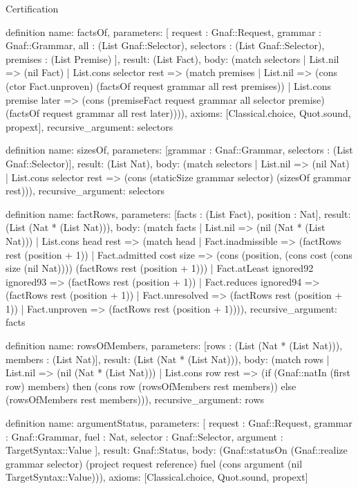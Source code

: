 \begin{lexlean}{Certification}
\begin{semanticmodule}
definition{
  name: factsOf,
  parameters: [
    request : Gnaf::Request,
    grammar : Gnaf::Grammar,
    all : (List Gnaf::Selector),
    selectors : (List Gnaf::Selector),
    premises : (List Premise)
  ],
  result: (List Fact),
  body: (match selectors
    | List.nil => (nil Fact)
    | List.cons selector rest => (match premises
      | List.nil => (cons (ctor Fact.unproven) (factsOf request grammar all rest premises))
      | List.cons premise later => (cons (premiseFact request grammar all selector premise) (factsOf request grammar all rest later)))),
  axioms: [Classical.choice, Quot.sound, propext],
  recursive_argument: selectors
}

definition{
  name: sizesOf,
  parameters: [grammar : Gnaf::Grammar, selectors : (List Gnaf::Selector)],
  result: (List Nat),
  body: (match selectors
    | List.nil => (nil Nat)
    | List.cons selector rest => (cons (staticSize grammar selector) (sizesOf grammar rest))),
  recursive_argument: selectors
}

definition{
  name: factRows,
  parameters: [facts : (List Fact), position : Nat],
  result: (List (Nat * (List Nat))),
  body: (match facts
    | List.nil => (nil (Nat * (List Nat)))
    | List.cons head rest => (match head
      | Fact.inadmissible => (factRows rest (position + 1))
      | Fact.admitted cost size => (cons (position, (cons cost (cons size (nil Nat)))) (factRows rest (position + 1)))
      | Fact.atLeast ignored92 ignored93 => (factRows rest (position + 1))
      | Fact.reduces ignored94 => (factRows rest (position + 1))
      | Fact.unresolved => (factRows rest (position + 1))
      | Fact.unproven => (factRows rest (position + 1)))),
  recursive_argument: facts
}

definition{
  name: rowsOfMembers,
  parameters: [rows : (List (Nat * (List Nat))), members : (List Nat)],
  result: (List (Nat * (List Nat))),
  body: (match rows
    | List.nil => (nil (Nat * (List Nat)))
    | List.cons row rest => (if (Gnaf::natIn (first row) members) then (cons row (rowsOfMembers rest members)) else (rowsOfMembers rest members))),
  recursive_argument: rows
}

definition{
  name: argumentStatus,
  parameters: [
    request : Gnaf::Request,
    grammar : Gnaf::Grammar,
    fuel : Nat,
    selector : Gnaf::Selector,
    argument : TargetSyntax::Value
  ],
  result: Gnaf::Status,
  body: (Gnaf::statusOn (Gnaf::realize grammar selector) (project request reference) fuel (cons argument (nil TargetSyntax::Value))),
  axioms: [Classical.choice, Quot.sound, propext]
}


\end{semanticmodule}
\end{lexlean}
